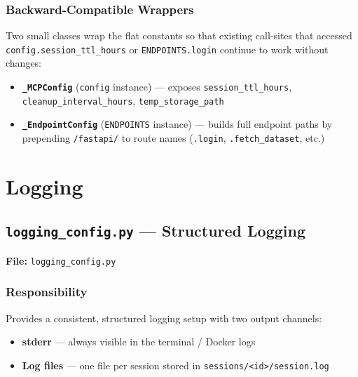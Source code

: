 \documentclass[12pt,a4paper]{report}
\begin{document}
\subsection{Backward-Compatible Wrappers}

Two small classes wrap the flat constants so that existing call-sites that
accessed \texttt{config.session\_ttl\_hours} or \texttt{ENDPOINTS.login}
continue to work without changes:

\begin{itemize}[noitemsep]
  \item \textbf{\texttt{\_MCPConfig}} (\texttt{config} instance) --- exposes \texttt{session\_ttl\_hours}, \texttt{cleanup\_interval\_hours}, \texttt{temp\_storage\_path}
  \item \textbf{\texttt{\_EndpointConfig}} (\texttt{ENDPOINTS} instance) --- builds full endpoint paths by prepending \texttt{/fastapi/} to route names (\texttt{.login}, \texttt{.fetch\_dataset}, etc.)
\end{itemize}

\chapter{Logging}

\section{\texttt{logging\_config.py} --- Structured Logging}

\begin{mdframed}[style=filebox]
\textbf{File:} \texttt{logging\_config.py}
\end{mdframed}

\subsection{Responsibility}

Provides a consistent, structured logging setup with two output channels:
\begin{itemize}[noitemsep]
  \item \textbf{stderr} --- always visible in the terminal / Docker logs
  \item \textbf{Log files} --- one file per session stored in \texttt{sessions/<id>/session.log}
\end{itemize}
\end{document}
